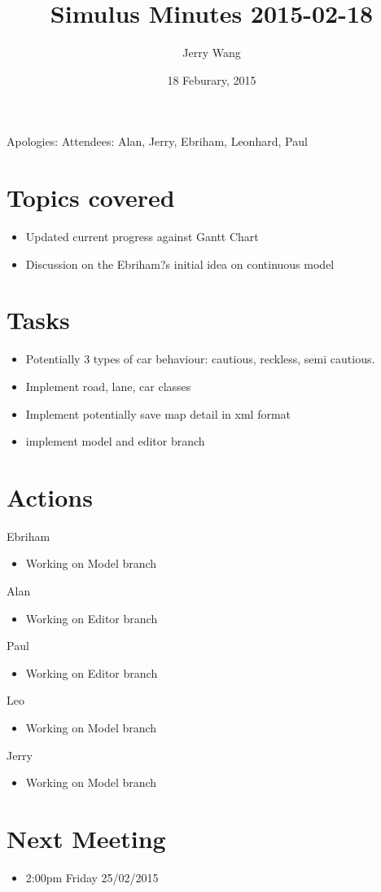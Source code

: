 \documentclass{article}
\author {Jerry Wang}
\title{Simulus Minutes 2015-02-18}
\date {18 Feburary, 2015}
\begin{document}
\maketitle




\noindent Apologies: 
\newline 
Attendees: Alan, Jerry, Ebriham, Leonhard, Paul


\section {Topics covered}
\begin{itemize}
\item  Updated current progress against Gantt Chart
\item Discussion on the Ebriham?s initial idea on continuous model 
\end{itemize}



\section {Tasks}

\begin{itemize}
\item Potentially 3 types of car behaviour: cautious, reckless, semi cautious.  
 \item    Implement road, lane, car classes
 \item Implement potentially save map detail in xml format 
 \item   implement model and editor branch
 
\end{itemize}

\section {Actions}
Ebriham 
\begin{itemize}
\item Working on Model branch
\end{itemize}

\noindent
Alan
\begin{itemize}
\item  Working on Editor branch
     
\end{itemize}

\noindent
Paul
\begin{itemize}
\item Working on Editor branch
\end{itemize}

\noindent
Leo 
\begin{itemize}
\item Working on Model branch
\end{itemize}

\noindent
Jerry
\begin{itemize}
\item Working on Model branch
\end{itemize}



\section {Next Meeting}
\begin{itemize}
\item  2:00pm Friday 25/02/2015

\end{itemize}
\end{document}
